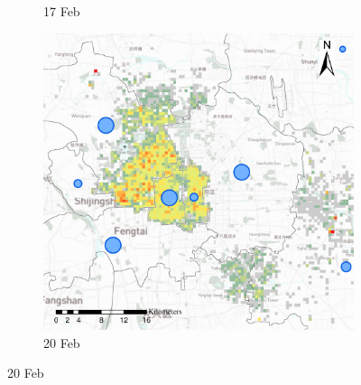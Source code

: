 \documentclass[preprints,ijgi,submit,moreauthors]{Definitions/mdpi}
\begin{document}
\begin{figure}[ht]
\begin{subfigure}{.3\textwidth}
        \caption{17 Feb}\label{fig:correlation_02_17}
    \end{subfigure}
    \begin{subfigure}{.3\textwidth}
        \includegraphics[width=\textwidth]{Figures/Relation_with_confrimed_cases/NewDistrictSSBD2020_02_20.eps}
        \caption{20 Feb}\label{fig:correlation_02_20}
    \end{subfigure}
    

\end{figure}
\end{document}
